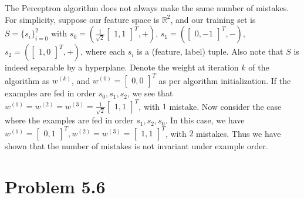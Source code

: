 \documentclass{article}
\begin{document}
The Perceptron algorithm does not always make the same number of mistakes. For simplicity, suppose our feature space is $\mathbb{R}^2$, and our training set is $S = \{s_i\}_{i=0}^2$ with $s_0 = \left(\frac{1}{\sqrt{2}}\begin{bmatrix} 1,1 \end{bmatrix}^T,+\right)$, $s_1 = \left(\begin{bmatrix} 0,-1\end{bmatrix}^T,-\right)$, $s_2 = \left(\begin{bmatrix} 1,0 \end{bmatrix}^T,+\right)$, where each $s_i$ is a (feature, label) tuple. Also note that $S$ is indeed separable by a hyperplane. Denote the weight at iteration $k$ of the algorithm as $w^{(k)}$, and $w^{(0)} = \begin{bmatrix} 0,0 \end{bmatrix}^T$ as per algorithm initialization. If the examples are fed in order $s_0,s_1,s_2$, we see that $w^{(1)} = w^{(2)} = w^{(3)} = \frac{1}{\sqrt{2}}\begin{bmatrix} 1,1 \end{bmatrix}^T$, with $1$ mistake. Now consider the case where the examples are fed in order $s_1,s_2,s_0$. In this case, we have $w^{(1)} = \begin{bmatrix} 0,1 \end{bmatrix}^T, w^{(2)} = w^{(3)} = \begin{bmatrix} 1,1 \end{bmatrix}^T$, with $2$ mistakes. Thus we have shown that the number of mistakes is not invariant under example order.

\section*{Problem 5.6}
\end{document}

